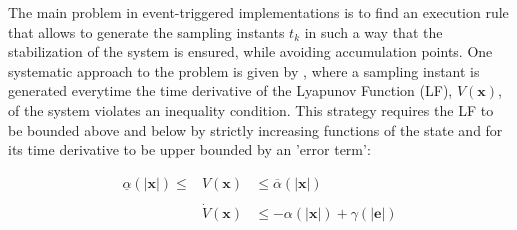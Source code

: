 \documentclass{article}
\begin{document}
		The main problem in event-triggered implementations is to find an execution rule that allows to generate the sampling instants $t_k$ in such a way that the stabilization of the system is ensured, while avoiding accumulation points. One systematic approach to the problem is given by \cite{tabuada_event_control}, where a sampling instant is generated everytime the time derivative of the Lyapunov Function (LF), $V(\mathbf{x})$, of the system violates an inequality condition. This strategy requires the LF to be bounded above and below by strictly increasing functions of the state and for its time derivative to be upper bounded by an 'error term':
		
		\begin{equation}
			\begin{array}{lll}
				\underline \alpha(|\mathbf{x}|) \leq & V(\mathbf{x}) & \leq \overline \alpha(|\mathbf{x}|) \\\\
				\, & \dot V(\mathbf{x}) & \leq -\alpha(|\mathbf{x}|) + \gamma(|\mathbf{e}|) \\
			\end{array}
			\label{event}
		\end{equation}
		
	
	
\end{document}
